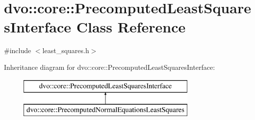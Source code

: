 \hypertarget{classdvo_1_1core_1_1_precomputed_least_squares_interface}{}\section{dvo\+:\+:core\+:\+:Precomputed\+Least\+Squares\+Interface Class Reference}
\label{classdvo_1_1core_1_1_precomputed_least_squares_interface}


{\ttfamily \#include $<$least\+\_\+squares.\+h$>$}

Inheritance diagram for dvo\+:\+:core\+:\+:Precomputed\+Least\+Squares\+Interface\+:\begin{figure}[H]
\begin{center}
\leavevmode
\includegraphics[height=2.000000cm]{classdvo_1_1core_1_1_precomputed_least_squares_interface}
\end{center}
\end{figure}

